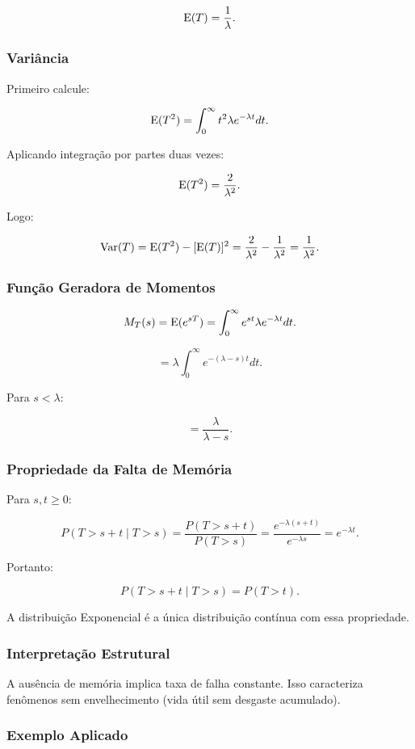 \[
\operatorname{E}(T)
=
\frac{1}{\lambda}.
\]

\subsubsection{Variância}

Primeiro calcule:

\[
\operatorname{E}(T^2)
=
\int_0^\infty
t^2 \lambda e^{-\lambda t} dt.
\]

Aplicando integração por partes duas vezes:

\[
\operatorname{E}(T^2)
=
\frac{2}{\lambda^2}.
\]

Logo:

\[
\operatorname{Var}(T)
=
\operatorname{E}(T^2) - [\operatorname{E}(T)]^2
=
\frac{2}{\lambda^2}
-
\frac{1}{\lambda^2}
=
\frac{1}{\lambda^2}.
\]

\subsubsection{Função Geradora de Momentos}

\[
M_T(s)
=
\operatorname{E}(e^{sT})
=
\int_0^\infty
e^{st}
\lambda e^{-\lambda t} dt.
\]

\[
=
\lambda
\int_0^\infty
e^{-(\lambda-s)t} dt.
\]

Para $s<\lambda$:

\[
=
\frac{\lambda}{\lambda-s}.
\]
\newpage
\subsubsection{Propriedade da Falta de Memória}

Para $s,t\ge0$:

\[
P(T>s+t \mid T>s)
=
\frac{P(T>s+t)}{P(T>s)}
=
\frac{e^{-\lambda(s+t)}}{e^{-\lambda s}}
=
e^{-\lambda t}.
\]

Portanto:

\[
P(T>s+t \mid T>s)
=
P(T>t).
\]

A distribuição Exponencial é a única distribuição contínua
com essa propriedade.

\subsubsection*{Interpretação Estrutural}

A ausência de memória implica taxa de falha constante.
Isso caracteriza fenômenos sem envelhecimento
(vida útil sem desgaste acumulado).

\subsubsection*{Exemplo Aplicado}

